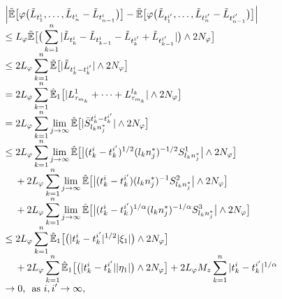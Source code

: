 \documentclass[a4paper,oneside,10pt]{article}%
\numberwithin{equation}{section}
\begin{document}
\[%
\begin{array}
[c]{l}%
\displaystyle \left \vert \mathbb{\tilde{E}}\big[\varphi \big(\tilde{L}
_{t_{1}^{i}},\ldots,\tilde{L}_{t_{n}^{i}}-\tilde{L}_{t_{n-1}^{i}
}\big)\big]-\mathbb{\tilde{E}}\big[\varphi \big(\tilde{L}_{t_{1}^{i^{\prime}}
},\ldots,\tilde{L}_{t_{n}^{i^{\prime}}}-\tilde{L}_{t_{n-1}^{i^{\prime}}
}\big)\big]\right \vert \\
\displaystyle \leq L_{\varphi}\mathbb{\tilde{E}}\big[\big(\sum_{k=1}
^{n}|\tilde{L}_{t_{k}^{i}}-\tilde{L}_{t_{k-1}^{i}}-\tilde{L}_{t_{k}
^{i^{\prime}}}+\tilde{L}_{t_{k-1}^{i^{\prime}}}|\big)\wedge2N_{\varphi}\big]\\
\displaystyle \leq2L_{\varphi}\sum_{k=1}^{n}\mathbb{\tilde{E}}\big[|\tilde
{L}_{t_{k}^{i}-t_{k}^{i^{\prime}}}|\wedge2N_{\varphi}\big]\\
\displaystyle=2L_{\varphi}\sum \limits_{k=1}^{n}\mathbb{\hat{E}}_{1}
\big[|L_{\tau_{m_{k}}}^{1}+\cdots+L_{\tau_{m_{k}}}^{l_{k}}|\wedge2N_{\varphi
}\big]\\
\displaystyle=2L_{\varphi}\sum_{k=1}^{n}\lim \limits_{j\rightarrow \infty
}\mathbb{\hat{E}}\big[|\bar{S}_{l_{k}n_{j}^{\ast}}^{t_{k}^{i}-t_{k}%
^{i^{\prime}}}|\wedge2N_{\varphi}\big]\\
\displaystyle \leq2L_{\varphi}\sum_{k=1}^{n}\lim \limits_{j\rightarrow \infty
}\mathbb{\hat{E}}\big[\big|(t_{k}^{i}-t_{k}^{i^{\prime}})^{1/2}(l_{k}
n_{j}^{\ast})^{-1/2}S_{l_{k}n_{j}^{\ast}}^{1}\big|\wedge2N_{\varphi}\big]\\
\displaystyle \text{ \  \ }+2L_{\varphi}\sum_{k=1}^{n}\lim \limits_{j\rightarrow
\infty}\mathbb{\hat{E}}\big[\big|(t_{k}^{i}-t_{k}^{i^{\prime}})(l_{k}%
n_{j}^{\ast})^{-1} S_{l_{k}n_{j}^{\ast}}^{2}\big|\wedge2N_{\varphi}\big]\\
\displaystyle \text{ \  \ }+2L_{\varphi}\sum_{k=1}^{n}\lim \limits_{j\rightarrow
\infty}\mathbb{\hat{E}}\big[\big|(t_{k}^{i}-t_{k}^{i^{\prime}})^{1/\alpha
}(l_{k}n_{j}^{\ast})^{-1/\alpha}S_{l_{k}n_{j}^{\ast}}^{3}\big|\wedge
2N_{\varphi}\big]\\
\displaystyle \leq2L_{\varphi}\sum_{k=1}^{n}\mathbb{\hat{E}}_{1}%
\big[\big(|t_{k}^{i}-t_{k}^{i^{\prime}}|^{1/2} |\xi_{1}|\big)\wedge
2N_{\varphi}\big]\\
\displaystyle \text{ \  \ }+2L_{\varphi}\sum_{k=1}^{n}\mathbb{\hat{E}}%
_{1}\big[\big(|t_{k}^{i}-t_{k}^{i^{\prime}}||\eta_{1}|\big)\wedge2N_{\varphi
}\big]+2L_{\varphi}M_{z}\sum_{k=1}^{n}|t_{k}^{i}-t_{k}^{i^{\prime}}%
|^{1/\alpha}\\
\displaystyle \rightarrow0\text{, \ as }i,i^{\prime}\rightarrow \infty,
\end{array}
\]
\end{document}
